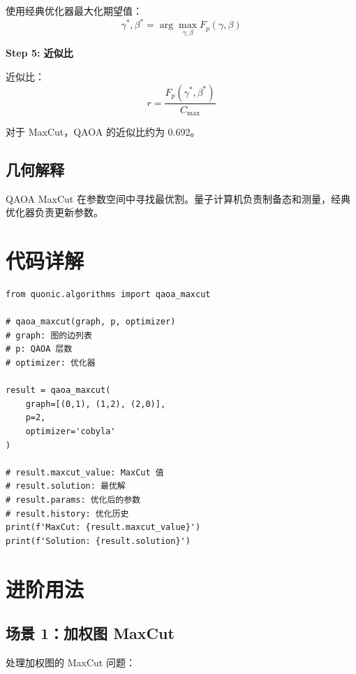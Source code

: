 \documentclass[12pt,a4paper]{article}
\begin{document}
使用经典优化器最大化期望值：
\begin{equation}
\gamma^*, \beta^* = \arg\max_{\gamma, \beta} F_p(\gamma, \beta)
\end{equation}

\textbf{Step 5: 近似比}

近似比：
\begin{equation}
r = \frac{F_p(\gamma^*, \beta^*)}{C_{\text{max}}}
\end{equation}

对于 MaxCut，QAOA 的近似比约为 0.692。

\subsection{几何解释}

QAOA MaxCut 在参数空间中寻找最优割。量子计算机负责制备态和测量，经典优化器负责更新参数。

\section{代码详解}

\begin{verbatim}
from quonic.algorithms import qaoa_maxcut

# qaoa_maxcut(graph, p, optimizer)
# graph: 图的边列表
# p: QAOA 层数
# optimizer: 优化器

result = qaoa_maxcut(
    graph=[(0,1), (1,2), (2,0)],
    p=2,
    optimizer='cobyla'
)

# result.maxcut_value: MaxCut 值
# result.solution: 最优解
# result.params: 优化后的参数
# result.history: 优化历史
print(f'MaxCut: {result.maxcut_value}')
print(f'Solution: {result.solution}')
\end{verbatim}

\section{进阶用法}

\subsection{场景 1：加权图 MaxCut}

处理加权图的 MaxCut 问题：
\end{document}

